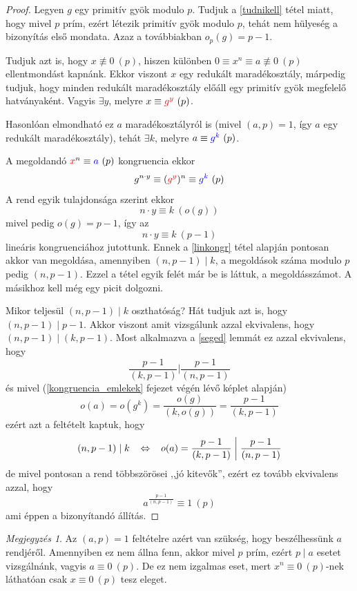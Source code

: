 \documentclass[12pt]{book}
\theoremstyle{plain} %
\theoremstyle{definition} %
\theoremstyle{remark}
\newtheorem*{mj}{Megjegyzés}
\numberwithin{equation}{section}  %
\begin{document}
	\begin{proof}
		Legyen $g$ egy primitív gyök modulo $p$. Tudjuk a \ref{tudnikell} tétel miatt, hogy mivel $p$ prím, ezért létezik primitív gyök modulo $p$, tehát nem hülyeség a bizonyítás első mondata. Azaz a továbbiakban $o_p(g)=p-1$.
		
		Tudjuk azt is, hogy $x\not\equiv 0\ (p)$, hiszen különben $0\equiv x^n \equiv a \not\equiv 0\ (p)$ ellentmondást kapnánk. Ekkor viszont $x$ egy redukált maradékosztály, márpedig tudjuk, hogy minden redukált maradékosztály előáll egy primitív gyök megfelelő hatványaként. Vagyis $\exists y$, melyre $x\equiv \color{red}g^y\color{black}\ (p)$.
		
		Hasonlóan elmondható ez $a$ maradékosztályról is (mivel $(a,p)=1$, így $a$ egy redukált maradékosztály), tehát $\exists k$, melyre $a\equiv \color{blue}g^k\color{black}\ (p)$.
		
		A megoldandó $\color{red}x\color{black}^n \equiv \color{blue}a\color{black}\ (p)$ kongruencia ekkor
		\[ g^{n\cdot y} \equiv (\color{red}g^y\color{black})^n \equiv \color{blue}g^k\color{black}\ (p)  \]
		A rend egyik tulajdonsága szerint ekkor
		\[ n\cdot y \equiv k\ (o(g))  \]
		mivel pedig $o(g)=p-1$, így az
		\[ n\cdot y \equiv k\ (p-1)  \]
		lineáris kongruenciához jutottunk. Ennek a \ref{linkongr} tétel alapján pontosan akkor van megoldása, amennyiben $(n,p-1)\mid k$, a megoldások száma modulo $p$ pedig $(n,p-1)$. Ezzel a tétel egyik felét már be is láttuk, a megoldásszámot. A másikhoz kell még egy picit dolgozni.
		
		Mikor teljesül $(n,p-1)\mid k$ oszthatóság? Hát tudjuk azt is, hogy $(n,p-1)\mid p-1$. Akkor viszont amit vizsgálunk azzal ekvivalens, hogy $(n,p-1)\mid (k,p-1)$. Most alkalmazva a \ref{seged} lemmát ez azzal ekvivalens, hogy
		\[ \dfrac{p-1}{(k,p-1)} \mathrel{\bigg|}  \dfrac{p-1}{(n,p-1)} \]
		és mivel (\ref{kongruencia_emlekek} fejezet végén lévő képlet alapján)
		\[ o(a) = o(g^k) = \dfrac{o(g)}{(k,o(g))} = \dfrac{p-1}{(k,p-1)} \]
		ezért azt a feltételt kaptuk, hogy
		\[ (n,p-1)\mid k \hspace{3mm} \Leftrightarrow \hspace{3mm} o(a)=\dfrac{p-1}{(k,p-1)} \mathrel{\bigg|} \dfrac{p-1}{(n,p-1)}  \]
		de mivel pontosan a rend többszörösei ,,jó kitevők'', ezért ez tovább ekvivalens azzal, hogy
		\[ a^{\frac{p-1}{(n,p-1)}} \equiv 1\ (p)  \]
		ami éppen a bizonyítandó állítás.
	\end{proof}
	
	\begin{mj}
		Az $(a,p)=1$ feltételre azért van szükség, hogy beszélhessünk $a$ rendjéről. Amennyiben ez nem állna fenn, akkor mivel $p$ prím, ezért $p\mid a$ esetet vizsgálnánk, vagyis $a\equiv 0\ (p)$. De ez nem izgalmas eset, mert $x^n \equiv 0\ (p)$-nek láthatóan csak $x\equiv 0\ (p)$ tesz eleget.
	\end{mj}
\end{document}
